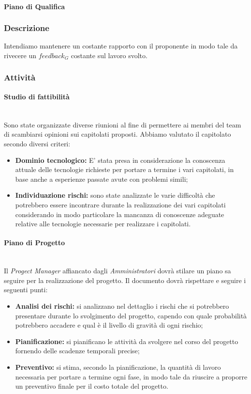 		\paragraph{Piano di Qualifica}
	\subsubsection{Descrizione}
	Intendiamo mantenere un costante rapporto con il proponente in modo tale da rivecere un $feedback_G$ costante sul lavoro svolto.
	\subsubsection{Attività} 
		\paragraph{Studio di fattibilità} \mbox{} \\
		Sono state organizzate diverse riunioni al fine di permettere ai membri del team di scambiarsi opinioni sui capitolati proposti. 
		Abbiamo valutato il capitolato secondo diversi criteri:
		\begin{itemize}
			\item \textbf{Dominio tecnologico:} E' stata presa in considerazione la conoscenza attuale delle tecnologie richieste per portare a termine i vari capitolati, in base
			anche a esperienze passate avute con problemi simili;
			\item \textbf{Individuazione rischi:} sono state analizzate le varie difficoltà che potrebbero essere incontrare durante la realizzazione dei vari capitolati considerando 
			in modo particolare la mancanza di conoscenze adeguate relative alle tecnologie necessarie per realizzare i capitolati.
		\end{itemize}  
		\paragraph{Piano di Progetto} \mbox{} \\
		Il \emph{Progect Manager} affiancato dagli \emph{Amministratori} dovrà stilare un piano sa seguire per la realizzazione del progetto.
		Il documento dovrà rispettare e seguire i seguenti punti:
		\begin{itemize}
		\item \textbf{Analisi dei rischi:} si analizzano nel dettaglio i rischi che si potrebbero presentare durante lo svolgimento del progetto, capendo con quale probabilità potrebbero accadere e qual è il livello di gravità di ogni rischio;
		\item \textbf{Pianificazione:} si pianificano le attività da svolgere nel corso del progetto fornendo delle scadenze temporali precise;
		\item \textbf{Preventivo:} si stima, secondo la pianificazione, la quantità di lavoro necessaria per portare a termine ogni fase, in modo tale da riuscire a proporre un preventivo finale per il costo totale del progetto.
		\end{itemize} 
		
